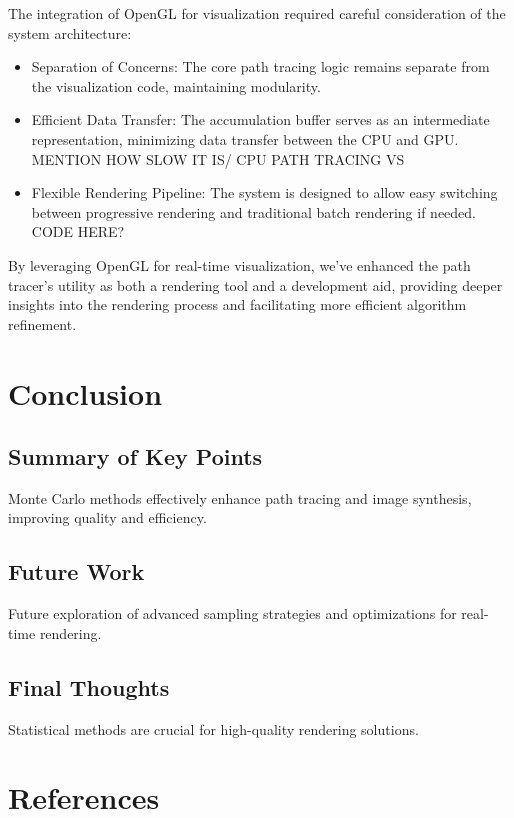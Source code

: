 \documentclass[12pt]{article}
\begin{document}
The integration of OpenGL for visualization required careful consideration of the system architecture:

\begin{itemize}
    \item Separation of Concerns: The core path tracing logic remains separate from the visualization code, maintaining modularity.
    \item Efficient Data Transfer: The accumulation buffer serves as an intermediate representation, minimizing data transfer between the CPU and GPU. MENTION HOW SLOW IT IS/ CPU PATH TRACING VS
    \item Flexible Rendering Pipeline: The system is designed to allow easy switching between progressive rendering and traditional batch rendering if needed. CODE HERE?
\end{itemize}

By leveraging OpenGL for real-time visualization, we've enhanced the path tracer's utility as both a rendering tool and a development aid, providing deeper insights into the rendering process and facilitating more efficient algorithm refinement.

\section{Conclusion}
\label{sec:conclusion}
\subsection{Summary of Key Points}
Monte Carlo methods effectively enhance path tracing and image synthesis, improving quality and efficiency.

\subsection{Future Work}
Future exploration of advanced sampling strategies and optimizations for real-time rendering.

\subsection{Final Thoughts}
Statistical methods are crucial for high-quality rendering solutions.

\section{References}
\label{sec:references}


\end{document}
